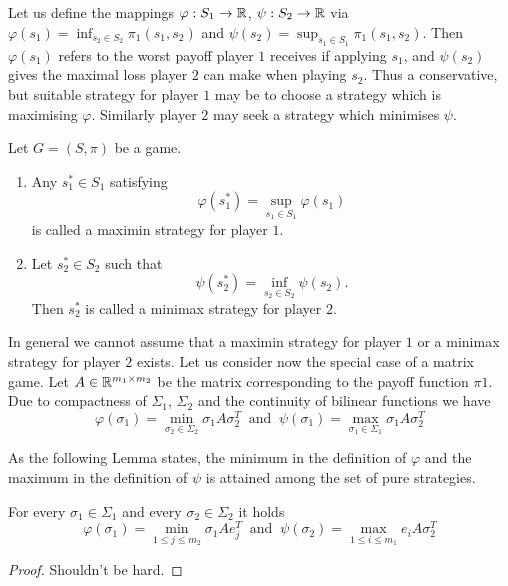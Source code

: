 Let us define the mappings $\varphi:S_{1}\to\mathbb{R}$, $\psi:S_{2}\to\mathbb{R}$ via $\varphi(s_{1}) = \inf_{s_{2}\in S_{2}}\pi_{1}(s_{1}, s_{2})$ and 
$\psi(s_{2}) = \sup_{s_{1}\in S_{1}}\pi_{1}(s_{1}, s_{2})$. Then $\varphi(s_{1})$ refers to the worst payoff player $1$ receives if applying $s_{1}$,
and $\psi(s_{2})$ gives the maximal loss player $2$ can make when playing $s_{2}$. Thus a conservative, but suitable strategy for player $1$ may be to choose
a strategy which is maximising $\varphi$. Similarly player $2$ may seek a strategy which minimises $\psi$. 

\begin{definition}\label{def:optSol}
    Let $G = (S, \pi)$ be a game. 
    \begin{enumerate}
        \item Any $s_{1}^{*}\in S_{1}$ satisfying
            \begin{equation*}
                \varphi(s_{1}^{*}) = \sup_{s_{1}\in S_{1}}\varphi(s_{1})
            \end{equation*}
            is called a maximin strategy for player $1$.
        \item Let $s_{2}^{*}\in S_{2}$ such that
            \begin{equation*}
                \psi(s_{2}^{*}) = \inf_{s_{2}\in S_{2}}\psi(s_{2}).
            \end{equation*}
            Then $s_{2}^{*}$ is called a minimax strategy for player $2$.
    \end{enumerate}
\end{definition}

In general we cannot assume that a maximin strategy for player $1$ or a minimax strategy for player $2$ exists. Let us consider now the special case of a
matrix game. Let $A\in\mathbb{R}^{m_{1}\times m_{2}}$ be the matrix corresponding to the payoff function $\pi{1}$. Due to compactness of $\Sigma_{1}$, 
$\Sigma_{2}$ and the continuity of bilinear functions we have
\begin{equation*}
    \varphi(\sigma_{1}) = \min_{\sigma_{2}\in\Sigma_{2}}\sigma_{1}A\sigma_{2}^{T} ~\text{ and }~ \psi(\sigma_{1}) = \max_{\sigma_{1}\in\Sigma_{1}}\sigma_{1}A\sigma_{2}^{T}
\end{equation*}

As the following Lemma states, the minimum in the definition of $\varphi$ and the maximum in the definition of $\psi$ is attained among the set of pure strategies.

\begin{lemma}
    For every $\sigma_{1}\in\Sigma_{1}$ and every $\sigma_{2}\in\Sigma_{2}$ it holds
    \begin{equation*}
        \varphi(\sigma_{1}) = \min_{1\leq j\leq m_{2}}\sigma_{1} Ae_{j}^{T} ~\text{ and }~ \psi(\sigma_{2}) = \max_{1\leq i\leq m_{1}}e_{i} A\sigma_{2}^{T}
    \end{equation*}
\end{lemma}
\begin{proof}
    Shouldn't be hard.
\end{proof}

